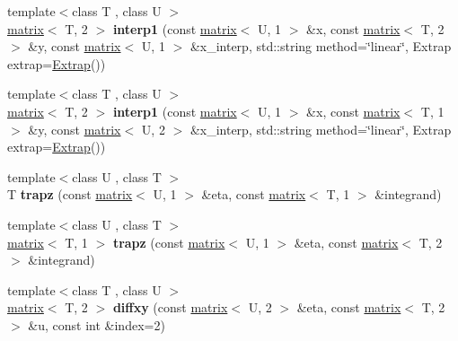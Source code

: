 \begin{DoxyCompactItemize}
\item 
\hypertarget{namespacekeycpp_ac3f799c4adf6335d1f4ca42057ffb603}{{\footnotesize template$<$class T , class U $>$ }\\\hyperlink{classkeycpp_1_1matrix}{matrix}$<$ T, 2 $>$ {\bfseries interp1} (const \hyperlink{classkeycpp_1_1matrix}{matrix}$<$ U, 1 $>$ \&x, const \hyperlink{classkeycpp_1_1matrix}{matrix}$<$ T, 2 $>$ \&y, const \hyperlink{classkeycpp_1_1matrix}{matrix}$<$ U, 1 $>$ \&x\-\_\-interp, std\-::string method=\char`\"{}linear\char`\"{}, Extrap extrap=\hyperlink{classkeycpp_1_1_extrap}{Extrap}())}\label{namespacekeycpp_ac3f799c4adf6335d1f4ca42057ffb603}

\item 
\hypertarget{namespacekeycpp_a66239f5f5276de220dd1ad8a6a2d8529}{{\footnotesize template$<$class T , class U $>$ }\\\hyperlink{classkeycpp_1_1matrix}{matrix}$<$ T, 2 $>$ {\bfseries interp1} (const \hyperlink{classkeycpp_1_1matrix}{matrix}$<$ U, 1 $>$ \&x, const \hyperlink{classkeycpp_1_1matrix}{matrix}$<$ T, 1 $>$ \&y, const \hyperlink{classkeycpp_1_1matrix}{matrix}$<$ U, 2 $>$ \&x\-\_\-interp, std\-::string method=\char`\"{}linear\char`\"{}, Extrap extrap=\hyperlink{classkeycpp_1_1_extrap}{Extrap}())}\label{namespacekeycpp_a66239f5f5276de220dd1ad8a6a2d8529}

\item 
\hypertarget{namespacekeycpp_a6f1aa362c40ee8f0e4d31a4060b1d9e0}{{\footnotesize template$<$class U , class T $>$ }\\T {\bfseries trapz} (const \hyperlink{classkeycpp_1_1matrix}{matrix}$<$ U, 1 $>$ \&eta, const \hyperlink{classkeycpp_1_1matrix}{matrix}$<$ T, 1 $>$ \&integrand)}\label{namespacekeycpp_a6f1aa362c40ee8f0e4d31a4060b1d9e0}

\item 
\hypertarget{namespacekeycpp_a8a0b0680673a79b8b3e4f184c5ff1fcd}{{\footnotesize template$<$class U , class T $>$ }\\\hyperlink{classkeycpp_1_1matrix}{matrix}$<$ T, 1 $>$ {\bfseries trapz} (const \hyperlink{classkeycpp_1_1matrix}{matrix}$<$ U, 1 $>$ \&eta, const \hyperlink{classkeycpp_1_1matrix}{matrix}$<$ T, 2 $>$ \&integrand)}\label{namespacekeycpp_a8a0b0680673a79b8b3e4f184c5ff1fcd}

\item 
\hypertarget{namespacekeycpp_adbb28bb59e9e552598c05ebe9d1af397}{{\footnotesize template$<$class T , class U $>$ }\\\hyperlink{classkeycpp_1_1matrix}{matrix}$<$ T, 2 $>$ {\bfseries diffxy} (const \hyperlink{classkeycpp_1_1matrix}{matrix}$<$ U, 2 $>$ \&eta, const \hyperlink{classkeycpp_1_1matrix}{matrix}$<$ T, 2 $>$ \&u, const int \&index=2)}\label{namespacekeycpp_adbb28bb59e9e552598c05ebe9d1af397}


\end{DoxyCompactItemize}
